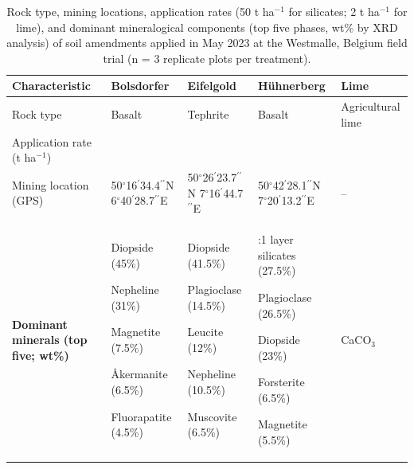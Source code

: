 \documentclass[preprint,12pt]{elsarticle}
\begin{document}
\begin{landscape}
\begin{table}[p]
\centering
\caption{Rock type, mining locations, application rates (50 t ha$^{-1}$ for silicates; 2 t ha$^{-1}$ for lime), and dominant mineralogical components (top five phases, wt\% by XRD analysis) of soil amendments applied in May 2023 at the Westmalle, Belgium field trial (n = 3 replicate plots per treatment).}
\label{tab:amendment_origins}
\small

\begin{tabular}{
>{\raggedright\arraybackslash}p{4.0cm}
>{\raggedright\arraybackslash}p{4.5cm}
>{\raggedright\arraybackslash}p{4.5cm}
>{\raggedright\arraybackslash}p{4.5cm}
>{\raggedright\arraybackslash}p{3.0cm}
}
\hline
\textbf{Characteristic}
& \textbf{Bolsdorfer}
& \textbf{Eifelgold}
& \textbf{H\"uhnerberg}
& \textbf{Lime} \\
\hline

Rock type
& Basalt
& Tephrite
& Basalt
& Agricultural lime \\

Application rate (t ha$^{-1}$)
& 50
& 50
& 50
& 2 \\

Mining location (GPS)
& \makecell[l]{50$^{\circ}$16$^{\prime}$34.4$^{\prime\prime}$N\\
6$^{\circ}$40$^{\prime}$28.7$^{\prime\prime}$E}
& \makecell[l]{50$^{\circ}$26$^{\prime}$23.7$^{\prime\prime}$N\\
7$^{\circ}$16$^{\prime}$44.7$^{\prime\prime}$E}
& \makecell[l]{50$^{\circ}$42$^{\prime}$28.1$^{\prime\prime}$N\\
7$^{\circ}$20$^{\prime}$13.2$^{\prime\prime}$E}
& -- \\

\hline
\textbf{Dominant minerals (top five; wt\%)}
&
Diopside (45\%) \par
Nepheline (31\%) \par
Magnetite (7.5\%) \par
\AA kermanite (6.5\%) \par
Fluorapatite (4.5\%)
&
Diopside (41.5\%) \par
Plagioclase (14.5\%) \par
Leucite (12\%) \par
Nepheline (10.5\%) \par
Muscovite (6.5\%)
&
2:1 layer silicates (27.5\%) \par
Plagioclase (26.5\%) \par
Diopside (23\%) \par
Forsterite (6.5\%) \par
Magnetite (5.5\%)
&
CaCO$_3$ \\

\hline
\end{tabular}
\end{table}
\end{landscape}
\end{document}
